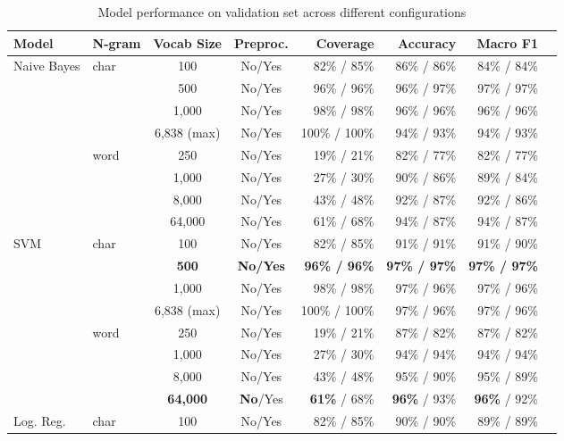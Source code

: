 \begin{table}[htbp]
    \centering
    \caption{Model performance on validation set across different configurations}
    \label{tab:performance}
    \begin{tabular}{llccrrrr}
        \toprule
        Model & N-gram & Vocab Size & Preproc. & Coverage & Accuracy & Macro F1 \\
        \midrule
        \multirow{8}{*}{Naive Bayes} 
        & \multirow{4}{*}{char} & 100 & No/Yes & 82\% / 85\% & 86\% / 86\% & 84\% / 84\%  \\
        & & 500 & No/Yes & 96\% / 96\% & 96\% / 97\% & 97\% / 97\%\\ 
        & & 1,000 & No/Yes & 98\% / 98\% & 96\% / 96\% & 96\% / 96\% \\
        & & 6,838 (max) & No/Yes & 100\% / 100\% & 94\% / 93\% & 94\% / 93\% \\
        \cmidrule{2-7}
        & \multirow{4}{*}{word} & 250 & No/Yes & 19\% / 21\% & 82\% / 77\% & 82\% / 77\% \\
        & & 1,000 & No/Yes & 27\% / 30\% & 90\% / 86\% & 89\% / 84\% \\
        & & 8,000 & No/Yes & 43\% / 48\% & 92\% / 87\% & 92\% / 86\%\\
        & & 64,000 & No/Yes & 61\% / 68\% & 94\% / 87\% & 94\% / 87\% \\
        \midrule
        \multirow{8}{*}{SVM}
        & \multirow{4}{*}{char} & 100 & No/Yes & 82\% / 85\% & 91\% / 91\% & 91\% / 90\% \\
        & & \textbf{500} & \textbf{No/Yes} & \textbf{96\% / 96\%} & \textbf{97\% / 97\%} & \textbf{97\% / 97\%} \\ 
        & & 1,000 & No/Yes & 98\% / 98\% & 97\% / 96\% & 97\% / 96\% \\
        & & 6,838 (max) & No/Yes & 100\% / 100\% & 97\% / 96\% & 97\% / 96\% \\
        \cmidrule{2-7}
        & \multirow{4}{*}{word} & 250 & No/Yes & 19\% / 21\% & 87\% / 82\% & 87\% / 82\% \\
        & & 1,000 & No/Yes & 27\% / 30\% & 94\% / 94\% & 94\% / 94\% \\
        & & 8,000 & No/Yes & 43\% / 48\% & 95\% / 90\% & 95\% / 89\% \\
        & & \textbf{64,000} & \textbf{No}/Yes & \textbf{61\%} / 68\% & \textbf{96\%} / 93\% & \textbf{96\%} / 92\% \\
        \midrule
        \multirow{8}{*}{Log. Reg.}
        & \multirow{4}{*}{char} & 100 & No/Yes & 82\% / 85\% & 90\% / 90\% & 89\% / 89\% \\

\end{tabular}
\end{table}
